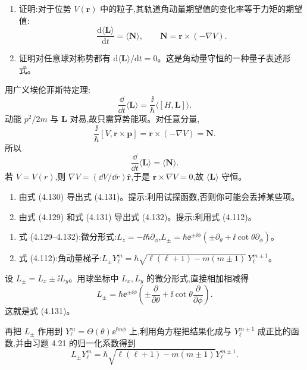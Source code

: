 \begin{question}
\begin{enumerate}
\item 证明:对于位势 $V(\mathbf r)$ 中的粒子,其轨道角动量期望值的变化率等于力矩的期望值:
\[
\frac{\mathrm d\langle\mathbf L\rangle}{\mathrm dt}=\langle\mathbf N\rangle,
\qquad \mathbf N=\mathbf r\times(-\nabla V).
\]
\item 证明对任意球对称势都有 $\mathrm d\langle\mathbf L\rangle/\mathrm dt=0$。这是角动量守恒的一种量子表述形式。
\end{enumerate}
\end{question}
\begin{solution}

用广义埃伦菲斯特定理:
\[
\frac{\dd}{\dd t}\langle\mathbf L\rangle=\frac{\ii}{\hbar}\langle[H,\mathbf L]\rangle.
\]
动能 $p^2/2m$ 与 $\mathbf L$ 对易,故只需算势能项。对任意分量,
\[
\frac{\ii}{\hbar}[V,\mathbf r\times\mathbf p]
=\mathbf r\times(-\nabla V)=\mathbf N.
\]
所以
\[
\frac{\dd}{\dd t}\langle\mathbf L\rangle=\langle\mathbf N\rangle.
\]
若 $V=V(r)$,则 $\nabla V=(\dd V/\dd r)\hat{\mathbf r}$,于是 $\mathbf r\times\nabla V=0$,故 $\langle\mathbf L\rangle$ 守恒。

\end{solution}

\begin{question}
\begin{enumerate}
\item 由式 (4.130) 导出式 (4.131)。提示:利用试探函数,否则你可能会丢掉某些项。
\item 由式 (4.129) 和式 (4.131) 导出式 (4.132)。提示:利用式 (4.112)。
\end{enumerate}

\par\smallskip
{}
\begin{enumerate}[leftmargin=2.2em,itemsep=0.12em,topsep=0.12em,parsep=0pt]
\item 式 (4.129--4.132):微分形式:$L_z=-\ii\hbar\partial_\phi$,$L_\pm=\hbar \ee^{\pm\ii\phi}(\pm\partial_\theta+\ii\cot\theta\partial_\phi)$。
\item 式 (4.112):角动量梯子:$L_\pm Y_\ell^m=\hbar\sqrt{\ell(\ell+1)-m(m\pm1)}\,Y_\ell^{m\pm1}$。
\end{enumerate}

\end{question}
\begin{solution}

设 $L_\pm=L_x\pm\ii L_y$。用球坐标中 $L_x,L_y$ 的微分形式,直接相加相减得
\[
L_\pm=\hbar \ee^{\pm\ii\phi}\left(\pm\frac{\partial}{\partial\theta}+\ii\cot\theta\frac{\partial}{\partial\phi}\right).
\]
这就是式 (4.131)。

再把 $L_\pm$ 作用到 $Y_\ell^m=\Theta(\theta)\ee^{\ii m\phi}$ 上,利用角方程把结果化成与 $Y_\ell^{m\pm1}$ 成正比的函数,并由习题 4.21 的归一化系数得到
\[
L_\pm Y_\ell^m=\hbar\sqrt{\ell(\ell+1)-m(m\pm1)}Y_\ell^{m\pm1}.
\]

\end{solution}

